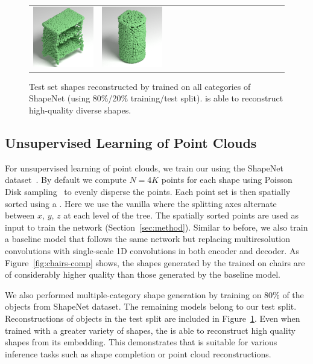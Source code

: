 \begin{figure}[t]
\begin{tabular}{cccccccccccccccc}
\includegraphics[width=.1\linewidth]{MRTNet/rendering/selected/rec_shapenet/pc_0048.png} &
\includegraphics[width=.1\linewidth]{MRTNet/rendering/selected/rec_shapenet/pc_0054.png}
\end{tabular}
\vspace{-12pt}
    \caption{\label{fig:gallery} 
    \small Test set shapes reconstructed by \mrvae trained on all categories of ShapeNet (using 80\%/20\% training/test split). \mrvae is able to reconstruct high-quality diverse shapes.}
    \vspace{-8pt}
\end{figure}

\subsection{Unsupervised Learning of Point Clouds} \label{sec:exp_gen}
For unsupervised learning of point clouds, we train our \mrvae using the ShapeNet dataset~\cite{chang2015shapenet}. 
By default we compute $N=4K$ points for each shape using Poisson Disk sampling~\cite{Bowers:2010:PPD} to evenly disperse the points. 
Each point set is then spatially sorted using a \kdtree. 
Here we use the vanilla \kdtree where the splitting axes alternate between $x$, $y$, $z$ at each level of the tree. 
The spatially sorted points are used as input to train the \mrvae network (Section~\ref{sec:method}). 
Similar to before, we also train a baseline model that follows the same network but replacing multiresolution convolutions with single-scale 1D convolutions
in both encoder and decoder. 
As Figure~\ref{fig:chairs-comp} shows, the shapes generated by the \mrvae trained on chairs are of considerably higher quality than those generated by the baseline model. 

We also performed multiple-category shape generation by training \mrvae on $80\%$ of the objects from ShapeNet dataset. 
The remaining models belong to our test split. 
Reconstructions of objects in the test split are included in Figure~\ref{fig:gallery}. 
Even when trained with a greater variety of shapes, the \mrvae is able to reconstruct high quality shapes from its embedding. 
This demonstrates that \mrvae is suitable for various inference tasks such as shape completion or point cloud reconstructions.

